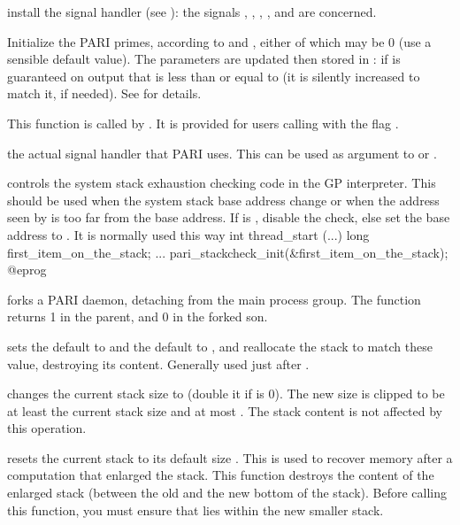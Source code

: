  install the signal handler 
(see ): the signals , , ,
,  and  are concerned.

 Initialize
the PARI primes, according to  and , either of
which may be 0 (use a sensible default value). The parameters are updated
then stored in : if is guaranteed on output that
 is less than or equal to  (it is silently
increased to match it, if needed). See  for details.

This function is called by . It is provided
for users calling  with the flag .

 the actual signal handler that
PARI uses. This can be used as argument to  or
.

 controls the system stack
exhaustion checking code in the GP interpreter. This should be used when the
system stack base address change or when the address seen by 
is too far from the base address. If  is , disable the
check, else set the base address to . It is normally used this
way
\bprog
int thread_start (...)
{
  long first_item_on_the_stack;
  ...
  pari_stackcheck_init(&first_item_on_the_stack);
}
@eprog

 forks a PARI daemon, detaching from the main
process group. The function returns 1 in the parent, and 0 in the
forked son.

sets the default  to  and the
default  to , and reallocate the
stack to match these value, destroying its content.
Generally used just after .

changes the current stack size to 
(double it if  is 0).
The new size is clipped to be at least the current stack size and
at most . The stack content is not affected
by this operation.

resets the current stack to its default size . This is
used to recover memory after a computation that enlarged the stack.
This function destroys the content of the enlarged stack (between
the old and the new bottom of the stack).
Before calling this function, you must ensure that  lies
within the new smaller stack.

